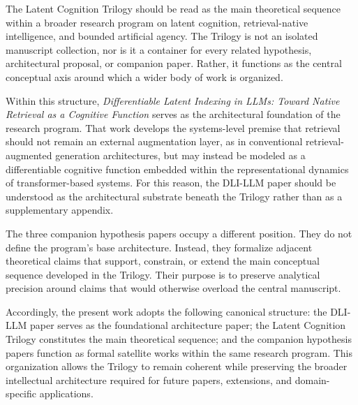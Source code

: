 \noindent
The Latent Cognition Trilogy should be read as the main theoretical sequence within a broader research program on latent cognition, retrieval-native intelligence, and bounded artificial agency. The Trilogy is not an isolated manuscript collection, nor is it a container for every related hypothesis, architectural proposal, or companion paper. Rather, it functions as the central conceptual axis around which a wider body of work is organized.

Within this structure, \textit{Differentiable Latent Indexing in LLMs: Toward Native Retrieval as a Cognitive Function} serves as the architectural foundation of the research program. That work develops the systems-level premise that retrieval should not remain an external augmentation layer, as in conventional retrieval-augmented generation architectures, but may instead be modeled as a differentiable cognitive function embedded within the representational dynamics of transformer-based systems. For this reason, the DLI-LLM paper should be understood as the architectural substrate beneath the Trilogy rather than as a supplementary appendix.

The three companion hypothesis papers occupy a different position. They do not define the program's base architecture. Instead, they formalize adjacent theoretical claims that support, constrain, or extend the main conceptual sequence developed in the Trilogy. Their purpose is to preserve analytical precision around claims that would otherwise overload the central manuscript.

Accordingly, the present work adopts the following canonical structure: the DLI-LLM paper serves as the foundational architecture paper; the Latent Cognition Trilogy constitutes the main theoretical sequence; and the companion hypothesis papers function as formal satellite works within the same research program. This organization allows the Trilogy to remain coherent while preserving the broader intellectual architecture required for future papers, extensions, and domain-specific applications.

